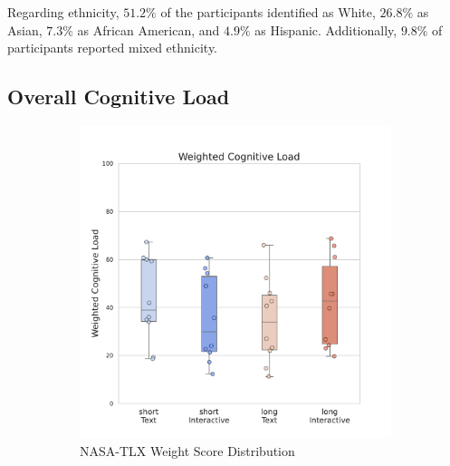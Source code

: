 Regarding ethnicity, $51.2\%$ of the participants identified as White, $26.8\%$ as Asian, $7.3\%$ as African American, and $4.9\%$ as Hispanic. Additionally, $9.8\%$ of participants reported mixed ethnicity.

\subsection{Overall Cognitive Load}
\label{sec:cog}
\begin{figure}[ht]
    \centering
    \begin{subfigure}[b]{0.45\textwidth}
        \centering
        \includegraphics[width=\textwidth]{content/image/results/nasatlx_final_value.pdf}
        \caption{NASA-TLX Weight Score Distribution}
        \label{fig:nasatlx-final1}
    \end{subfigure}
    \hfill
    \begin{subfigure}[b]{0.47\textwidth}
        \centering

\end{subfigure}
\end{figure}
